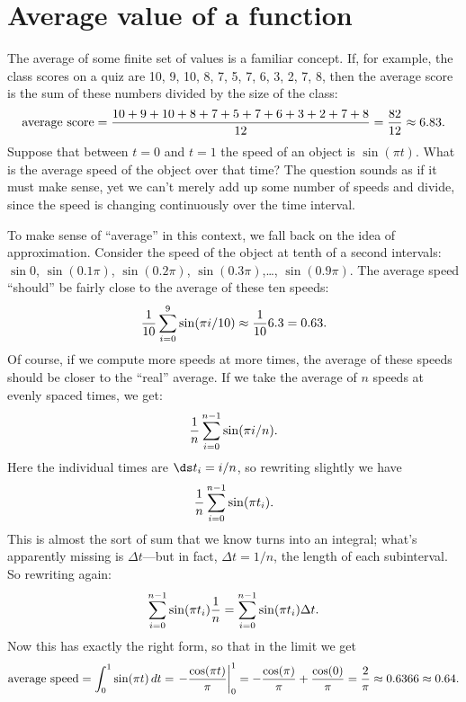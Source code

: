 \section{Average value of a function}{}{}
\nobreak
The average of some finite set of values is a familiar concept. If,
for example, the class scores on a quiz are 10, 9, 10, 8, 7, 5, 7, 6,
3, 2, 7, 8, then the average score is the sum of these numbers divided
by the size of the class:
$$
  \hbox{average score} = {10+ 9+ 10+ 8+ 7+ 5+ 7+ 6+
  3+ 2+ 7+ 8\over 12}={82\over 12}\approx 6.83.
$$
Suppose that between $t=0$ and $t=1$ the speed of an object is
$\sin(\pi t)$. What is the average speed of the object over that time?
The question sounds as if it must make sense, yet we can't merely add
up some number of speeds and divide, since the speed is changing
continuously over the time interval.

To make sense of ``average'' in this context, we fall back on the idea
of approximation. Consider the speed of the object at tenth of a
second intervals: $\sin 0$, $\sin(0.1\pi)$, $\sin(0.2\pi)$,
$\sin(0.3\pi)$,\dots, $\sin(0.9\pi)$. The average speed ``should'' be
fairly close to the average of these ten speeds:
$$
  {1\over 10}\sum_{i=0}^9 \sin(\pi i/10)\approx {1\over 10}6.3=0.63.
$$
Of course, if we compute more speeds at more times, the average of
these speeds should be closer to the ``real'' average. If we take the
average of $n$ speeds at evenly spaced times, we get:
$${1\over n}\sum_{i=0}^{n-1} \sin(\pi i/n).$$
Here the individual times are $\ds t_i=i/n$, so rewriting slightly we have
$${1\over n}\sum_{i=0}^{n-1} \sin(\pi t_i).$$
This is almost the sort of sum that we know turns into an integral;
what's apparently missing is $\Delta t$---but in fact, $\Delta t=1/n$,
the length of each subinterval. So rewriting again:
$$
  \sum_{i=0}^{n-1} \sin(\pi t_i){1\over n}=
  \sum_{i=0}^{n-1} \sin(\pi t_i)\Delta t.
$$
Now this has exactly the right form, so that in the limit we get
$$
  \hbox{average speed} = \int_0^1 \sin(\pi t)\,dt=
  \left.-{\cos(\pi t)\over\pi}\right|_0^1=
  -{\cos(\pi)\over \pi}+{\cos(0)\over\pi}={2\over\pi}\approx
  0.6366\approx 0.64.
$$

